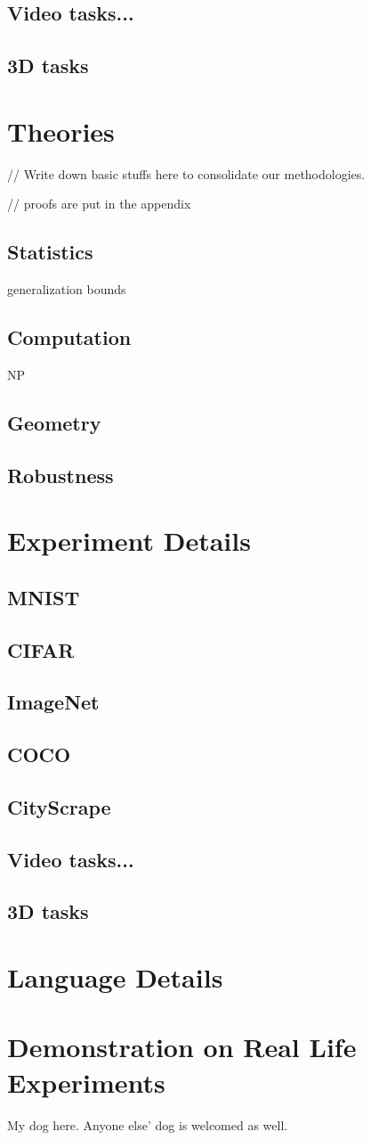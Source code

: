 \documentclass[10pt, oneside]{article}   	%
\theoremstyle{definition}
\begin{document}
\subsection{Video tasks...}
\subsection{3D tasks}
\section{Theories}
// Write down basic stuffs here to consolidate our methodologies.

// proofs are put in the appendix
\subsection{Statistics}
generalization bounds
\subsection{Computation}

NP
\subsection{Geometry}

\subsection{Robustness}


\clearpage
{}
\section{Experiment Details}
\subsection{MNIST}
\subsection{CIFAR}
\subsection{ImageNet}
\subsection{COCO}
\subsection{CityScrape}
\subsection{Video tasks...}
\subsection{3D tasks}
\section{Language Details}
\section{Demonstration on Real Life Experiments}

My dog here. Anyone else' dog is welcomed as well.
\end{document}
